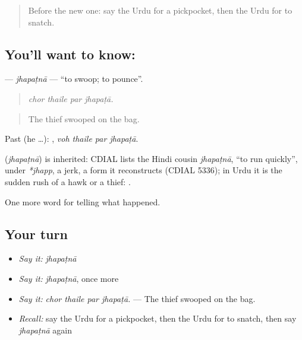 \label{lesson:UR-C277-jhapatna}



\begin{quote}
Before the new one: say the Urdu for a pickpocket, then the Urdu for to snatch.
\end{quote}

\subsection*{You'll want to know: }
\textbf{} — \emph{jhapaṭnā} — \textquotedblleft{}to swoop; to pounce\textquotedblright{}.

\begin{quote}
   
\end{quote}

\begin{quote}
\emph{chor thaile par jhapaṭā.}
\end{quote}

\begin{quote}
The thief swooped on the bag.
\end{quote}

Past (he …):    , \emph{voh thaile par jhapaṭā}.

\begin{cousinweb}
\textbf{} (\emph{jhapaṭnā}) is inherited: CDIAL lists the Hindi cousin \emph{jhapaṭnā}, \textquotedblleft{}to run quickly\textquotedblright{}, under \emph{*jhapp}, a jerk, a form it reconstructs (CDIAL 5336); in Urdu it is the sudden rush of a hawk or a thief: \textbf{  }.
\end{cousinweb}

\begin{grammarlens}[title={What you've built}]
One more word for telling what happened.
\end{grammarlens}

\subsection*{Your turn}
\begin{itemize}
\raggedright
  \item \emph{Say it:} \emph{jhapaṭnā}
  \item \emph{Say it:} \emph{jhapaṭnā}, once more
  \item \emph{Say it:} \emph{chor thaile par jhapaṭā.} — The thief swooped on the bag.
  \item \emph{Recall:} say the Urdu for a pickpocket, then the Urdu for to snatch, then say \emph{jhapaṭnā} again
\end{itemize}

